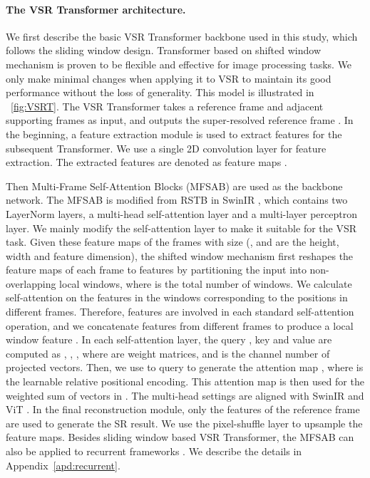 \documentclass{article}
\begin{document}
\paragraph{The VSR Transformer architecture.}
\label{sec:architecture}
We first describe the basic VSR Transformer backbone used in this study, which follows the sliding window design.
Transformer based on shifted window mechanism \cite{liang2021swinir} is proven to be flexible and effective for image processing tasks.
We only make minimal changes when applying it to VSR to maintain its good performance without the loss of generality. 
This model is illustrated in \figurename~\ref{fig:VSRT}.
The VSR Transformer takes a reference frame  and  adjacent supporting frames  as input, and outputs the super-resolved reference frame .
In the beginning, a feature extraction module is used to extract features for the subsequent Transformer.
We use a single 2D convolution layer for feature extraction.
The extracted features are denoted as  feature maps .



Then  Multi-Frame Self-Attention Blocks (MFSAB) are used as the backbone network.
The MFSAB is modified from RSTB in SwinIR \cite{liang2021swinir}, which contains two LayerNorm \cite{ba2016layer} layers, a multi-head self-attention layer and a multi-layer perceptron layer.
We mainly modify the self-attention layer to make it suitable for the VSR task.
Given these  feature maps of the frames with size  (,  and  are the height, width and feature dimension), the shifted window mechanism first reshapes the feature maps of each frame to  features by partitioning the input into non-overlapping  local windows, where  is the total number of windows.
We calculate self-attention on the features in the windows corresponding to the positions in different frames.
Therefore,  features are involved in each standard self-attention operation, and we concatenate features from different frames to produce a local window feature .
In each self-attention layer, the query , key  and value  are computed as , , , where  are weight matrices, and  is the channel number of projected vectors.
Then, we use  to query  to generate the attention map , where  is the learnable relative positional encoding.
This attention map  is then used for the weighted sum of  vectors in .
The multi-head settings are aligned with SwinIR \cite{liang2021swinir} and ViT \cite{dosovitskiy2020image}.
In the final reconstruction module, only the features of the reference frame are used to generate the SR result.
We use the pixel-shuffle layer \cite{shi2016real} to upsample the feature maps.
Besides sliding window based VSR Transformer, the MFSAB can also be applied to recurrent frameworks \cite{chan2021basicvsr++}.
We describe the details in Appendix~\ref{apd:recurrent}.
\end{document}
